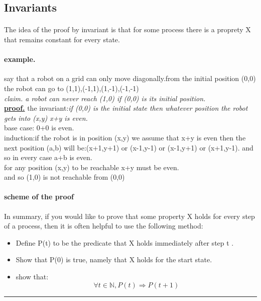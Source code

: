 \documentclass[10pt]{article}
\begin{document}
		\subsection{Invariants}{
			\paragraph{}{
				The idea of the proof by invariant is that for some process there is a proprety X that remains constant for every state.}
			\paragraph{example.}{
				say that a robot on a grid can only move diagonally.from the initial position (0,0) the robot can go to (1,1),(-1,1),(1,-1),(-1,-1)\\
				\emph{claim. a robot can never reach (1,0) if (0,0) is its initial position.}\\
				\textbf{\underline{proof.}} the invariant:\emph{if (0,0) is the initial state then whatever position the robot gets into (x,y) x+y is even.}\\
				base case: 0+0 is even.\\
				induction:if the robot is in position (x,y) we assume that x+y is even then the next position (a,b) will be:(x+1,y+1) or (x-1,y-1) or (x-1,y+1) or (x+1,y-1). and so in every case a+b is even.\\
				for any position (x,y) to be reachable x+y must be even.\\and so (1,0) is not reachable from (0,0)
				
				
			}
			\paragraph{scheme of the proof}{
			In summary, if you would like to prove that some property X holds for every
			step of a process, then it is often helpful to use the following method:
			\begin{itemize}
				\item Define P(t) to be the predicate that X holds immediately after step t .
				\item Show that P(0) is true, namely that X holds for the start state.
				\item show that:
				\[
				\forall t\in\mathbb{N},P(t)\Rightarrow P(t+1)
				\]
			\end{itemize}
			}
		}
	\pagebreak
	\par\noindent\rule{\textwidth}{3pt}
\end{document}
